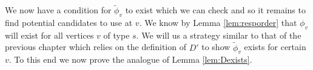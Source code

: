 \documentclass[class=book, crop=false]{standalone}
\begin{document}
%
%
%
We now have a condition for $\tilde{\phi}_v$ to exist which we can check and so it remains to find potential candidates to use at $v.$ We know by Lemma \ref{lem:resporder} that $\phi_{v}$ will exist for all vertices $v$ of type $s.$ We will us a strategy similar to that of the previous chapter which relies on the definition of $D'$ to show $\tilde{\phi}_v$ exists for certain $v.$ To this end we now prove the analogue of Lemma \ref{lem:Dexists}.
\end{document}
